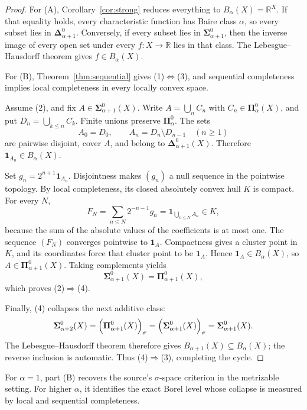 \documentclass[11pt]{article}
\newcommand{\R}{\mathbb{R}}
\begin{document}
\begin{proof}
For (A), Corollary~\ref{cor:strong} reduces everything to
$B_\alpha(X)=\R^X$.  If that equality holds, every characteristic function
has Baire class $\alpha$, so every subset lies in
$\boldsymbol\Delta^0_{\alpha+1}$.  Conversely, if every subset lies in
$\boldsymbol\Sigma^0_{\alpha+1}$, then the inverse image of every open set
under every $f:X\to\R$ lies in that class.  The Lebesgue--Hausdorff theorem
gives $f\in B_\alpha(X)$.

For (B), Theorem~\ref{thm:sequential} gives (1)$\Leftrightarrow$(3), and
sequential completeness implies local completeness in every locally convex
space.

Assume (2), and fix
$A\in\boldsymbol\Sigma^0_{\alpha+1}(X)$.  Write
$A=\bigcup_n C_n$ with $C_n\in\boldsymbol\Pi^0_\alpha(X)$, and put
$D_n=\bigcup_{k\leq n}C_k$.  Finite unions preserve
$\boldsymbol\Pi^0_\alpha$.  The sets
\[
 A_0=D_0,
 \qquad A_n=D_n\setminus D_{n-1}\quad(n\geq1)
\]
are pairwise disjoint, cover $A$, and belong to
$\boldsymbol\Delta^0_{\alpha+1}(X)$.  Therefore
$\mathbf 1_{A_n}\in B_\alpha(X)$.

Set $g_n=2^{n+1}\mathbf 1_{A_n}$.  Disjointness makes $(g_n)$ a null sequence
in the pointwise topology.  By local completeness, its closed absolutely
convex hull $K$ is compact.  For every $N$,
\[
 F_N=\sum_{n\leq N}2^{-n-1}g_n
     =\mathbf 1_{\bigcup_{n\leq N}A_n}
     \in K,
\]
because the sum of the absolute values of the coefficients is at most one.
The sequence $(F_N)$ converges pointwise to $\mathbf 1_A$.  Compactness gives
a cluster point in $K$, and its coordinates force that cluster point to be
$\mathbf 1_A$.  Hence $\mathbf 1_A\in B_\alpha(X)$, so
$A\in\boldsymbol\Pi^0_{\alpha+1}(X)$.  Taking complements yields
\[
 \boldsymbol\Sigma^0_{\alpha+1}(X)
 =\boldsymbol\Pi^0_{\alpha+1}(X),
\]
which proves (2)$\Rightarrow$(4).

Finally, (4) collapses the next additive class:
\[
 \boldsymbol\Sigma^0_{\alpha+2}(X)
 =\Bigl(\boldsymbol\Pi^0_{\alpha+1}(X)\Bigr)_\sigma
 =\Bigl(\boldsymbol\Sigma^0_{\alpha+1}(X)\Bigr)_\sigma
 =\boldsymbol\Sigma^0_{\alpha+1}(X).
\]
The Lebesgue--Hausdorff theorem therefore gives
$B_{\alpha+1}(X)\subseteq B_\alpha(X)$; the reverse inclusion is automatic.
Thus (4)$\Rightarrow$(3), completing the cycle.
\end{proof}

For $\alpha=1$, part (B) recovers the source's $\sigma$-space criterion in
the metrizable setting.  For higher $\alpha$, it identifies the exact Borel
level whose collapse is measured by local and sequential completeness.
\end{document}
